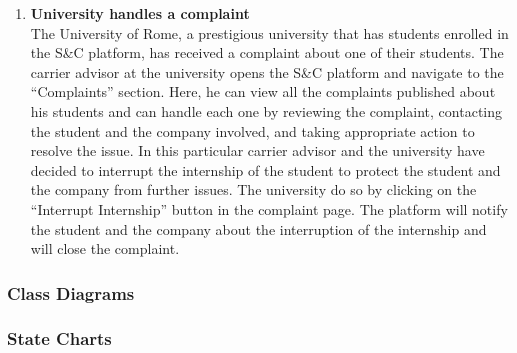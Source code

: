 \begin{enumerate}
    \item \textbf{\textcolor{titleColor}{University handles a complaint}}\\
        The University of Rome, a prestigious university that has students enrolled in the S\&C platform, has received a complaint about one of their students. The carrier advisor at the university opens the S\&C platform and navigate to the “Complaints” section. Here, he can view all the complaints published about his students and can handle each one by reviewing the complaint, contacting the student and the company involved, and taking appropriate action to resolve the issue.
        In this particular carrier advisor and the university have decided to interrupt the internship of the student to protect the student and the company from further issues. The university do so by clicking on the “Interrupt Internship” button in the complaint page. The platform will notify the student and the company about the interruption of the internship and will close the complaint.
\end{enumerate}


\subsubsection{Class Diagrams}

\subsubsection{State Charts}


